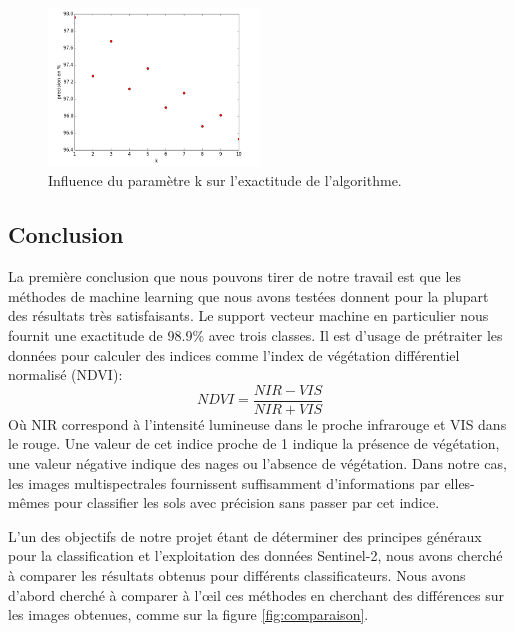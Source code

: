 \documentclass[a4paper,10pt]{article}
\begin{document}
\begin{figure}[H]
  \centering
    \includegraphics[width=0.5\textwidth]{influencek}
  \caption{Influence du paramètre k sur l'exactitude de l'algorithme.}
  \label{fig:kNN}
\end{figure}

\subsection{Conclusion}
La première conclusion que nous pouvons tirer de notre travail est que les méthodes de machine learning que nous avons testées donnent pour la plupart des résultats très satisfaisants. Le support vecteur machine en particulier nous fournit une exactitude de 98.9\% avec trois classes. Il est d'usage de prétraiter les données pour calculer des indices comme l'index de végétation différentiel normalisé (NDVI)\cite{NDVI}:
\begin{equation}
NDVI=\frac{NIR-VIS}{NIR+VIS}
\end{equation}
Où NIR correspond à l'intensité lumineuse dans le proche infrarouge et VIS dans le rouge. Une valeur de cet indice proche de 1 indique la présence de végétation, une valeur négative indique des nages ou l'absence de végétation. Dans notre cas, les images multispectrales fournissent suffisamment d'informations par elles-mêmes pour classifier les sols avec précision sans passer par cet indice.

L'un des objectifs de notre projet étant de déterminer des principes généraux pour la classification et l'exploitation des données Sentinel-2, nous avons cherché à comparer les résultats obtenus pour différents classificateurs. Nous avons d'abord cherché à comparer à l'œil ces méthodes en cherchant des différences sur les images obtenues, comme sur la figure \ref{fig:comparaison}.
\end{document}
